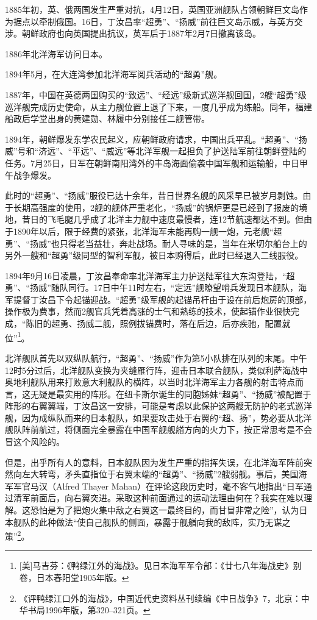 \documentclass[12pt,UTF8]{ctexbook}
\begin{document}
1885年初，英、俄两国发生严重对抗，4月12日，英国亚洲舰队占领朝鲜巨文岛作为据点以牵制俄国。16日，丁汝昌率“超勇”、“扬威”前往巨文岛示威，与英方交涉。朝鲜政府也向英国提出抗议，英军后于1887年2月7日撤离该岛。

1886年北洋海军访问日本。

1894年5月，在大连湾参加北洋海军阅兵活动的“超勇”舰。

1887年，中国在英德两国购买的“致远”、“经远”级新式巡洋舰回国，2艘“超勇”级巡洋舰完成历史使命，从主力舰位置上退了下来，一度几乎成为练船。同年，福建船政后学堂出身的黄建勋、林履中分别接任二舰管带。

1894年，朝鲜爆发东学农民起义，应朝鲜政府请求，中国出兵平乱。“超勇”、“扬威”号和“济远”、“平远”、“威远”等北洋军舰一起担负了护送陆军前往朝鲜登陆的任务。7月25日，日军在朝鲜南阳湾外的丰岛海面偷袭中国军舰和运输船，中日甲午战争爆发。

此时的“超勇”、“扬威”服役已达十余年，昔日世界名舰的风采早已被岁月剥蚀。由于长期高强度的使用，2舰的舰体严重老化，“扬威”的锅炉更是已经到了报废的境地，昔日的飞毛腿几乎成了北洋主力舰中速度最慢者，连12节航速都达不到。但由于1890年以后，限于经费的紧张，北洋海军未能再购一舰一炮，元老舰“超勇”、“扬威”也只得老当益壮，奔赴战场。耐人寻味的是，当年在米切尔船台上的另外一艘和“超勇”级同型的智利军舰，被日本购得后，此时已经退入二线服役。

1894年9月16日凌晨，丁汝昌奉命率北洋海军主力护送陆军往大东沟登陆，“超勇”、“扬威”随队同行。17日中午11时左右，“定远”舰瞭望哨兵发现日本舰队，海军提督丁汝昌下令起锚迎战。“超勇”级军舰的起锚吊杆由于设在前后炮房的顶部，操作极为费事，然而2舰官兵凭着高涨的士气和熟练的技术，使起锚作业很快完成，“陈旧的超勇、扬威二舰，照例拔锚费时，落在后边，后亦疾驰，配置就位”\footnote{[美]马吉芬：《鸭绿江外的海战》。见日本海军军令部：《廿七八年海战史》别卷，日本春阳堂1905年版。}。

北洋舰队首先以双纵队航行，“超勇”、“扬威”作为第5小队排在队列的末尾。中午12时5分过后，北洋舰队变换为夹缝雁行阵，迎击日本联合舰队，类似利萨海战中奥地利舰队用来打败意大利舰队的横阵，以当时北洋海军主力各舰的射击特点而言，这无疑是最实用的阵形。在纽卡斯尔诞生的同胞姊妹“超勇”、“扬威”被配置于阵形的右翼翼端，丁汝昌这一安排，可能是考虑以此保护这两艘无防护的老式巡洋舰，因为成纵队而来的日本舰队，如果要攻击处于右翼的“超、扬”，势必要从北洋舰队阵前航过，将侧面完全暴露在中国军舰舰艏方向的火力下，按正常思考是不会冒这个风险的。

但是，出乎所有人的意料，日本舰队因为发生严重的指挥失误，在北洋海军阵前突然向左大转弯，矛头直指位于右翼末端的“超勇”、“扬威”2艘弱舰。事后，美国海军军官马汉（Alfred Thayer Mahan）在评论这段历史时，毫不客气地指出“日军通过清军前面后，向右翼突进。采取这种前面通过的运动法理由何在？我实在难以理解。这恐怕是为了把炮火集中敌之右翼这一最终目的，而甘冒非常之险”，认为日本舰队的此种做法“使自己舰队的侧面，暴露于舰艏向我的敌阵，实乃无谋之策”\footnote{《评鸭绿江口外的海战》，中国近代史资料丛刊续编《中日战争》7，北京：中华书局1996年版，第320--321页。}。
\end{document}
